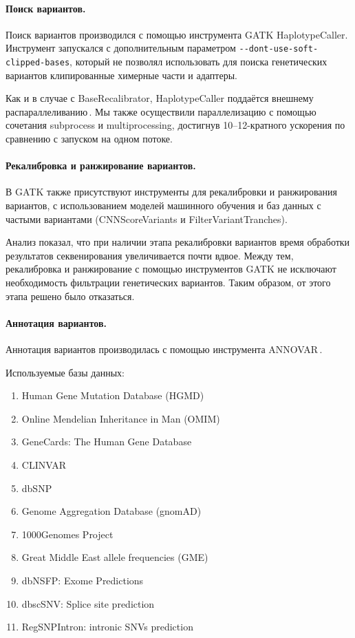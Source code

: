 \documentclass[a4paper,14pt]{extarticle}
\newcommand{\utilname}[1]{\textenglish{#1}}
\newcommand{\ecitep}[1]{\textenglish{\citep{#1}}}
\begin{document}
\paragraph{Поиск вариантов.}
Поиск вариантов производился с помощью инструмента \utilname{GATK HaplotypeCaller}.
Инструмент запускался с дополнительным параметром \verb|--dont-use-soft-clipped-bases|, который не позволял использовать для поиска генетических вариантов клипированные химерные части и адаптеры.

Как и в случае с \utilname{BaseRecalibrator}, \utilname{HaplotypeCaller} поддаётся внешнему распараллеливанию\,\ecitep{Heldenbrand_2019}.
Мы также осуществили параллелизацию с помощью сочетания \utilname{subprocess} и \utilname{multiprocessing}, достигнув 10--12-кратного ускорения по сравнению с запуском на одном потоке.

\paragraph{Рекалибровка и ранжирование вариантов.}
В GATK также присутствуют инструменты для рекалибровки и ранжирования вариантов, с использованием моделей машинного обучения и баз данных с частыми вариантами (\utilname{CNNScoreVariants} и \utilname{FilterVariantTranches}).

Анализ показал, что при наличии этапа рекалибровки вариантов время обработки результатов секвенирования увеличивается почти вдвое.
Между тем, рекалибровка и ранжирование с помощью инструментов GATK не исключают необходимость фильтрации генетических вариантов.
Таким образом, от этого этапа решено было отказаться.

\paragraph{Аннотация вариантов.}
Аннотация вариантов производилась с помощью инструмента \utilname{ANNOVAR}\,\ecitep{Wang_2010}.

Используемые базы данных:

\begin{enumerate}
	\item Human Gene Mutation Database (HGMD\textregistered)\,\ecitep{Stenson_2017}
	\item Online Mendelian Inheritance in Man (OMIM\textregistered)\,\ecitep{Amberger_2014}
	\item GeneCards\textregistered: The Human Gene Database\,\ecitep{Stelzer_2016}
	\item CLINVAR\,\ecitep{Landrum_2017}
	\item dbSNP\,\ecitep{Sherry_2001}
	\item Genome Aggregation Database (gnomAD)\,\ecitep{Karczewski_2020}
	\item 1000Genomes Project\,\ecitep{Auton_2015}
	\item Great Middle East allele frequencies (GME)\,\ecitep{Scott_2016}
	\item dbNSFP: Exome Predictions\,\ecitep{Liu_2016}
	\item dbscSNV: Splice site prediction\,\ecitep{Jian_2013}
	\item RegSNPIntron: intronic SNVs prediction\,\ecitep{Lin_2019}
\end{enumerate}
\end{document}
